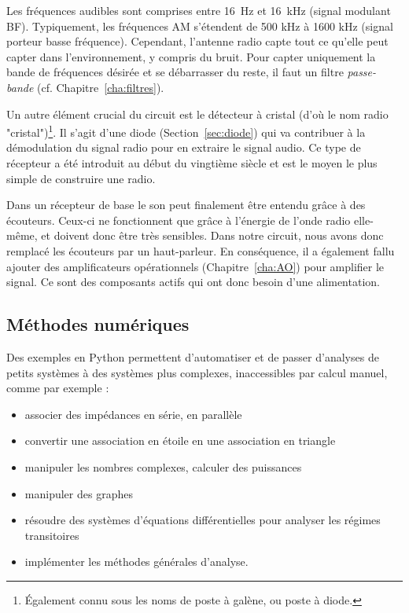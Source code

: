 Les fréquences audibles sont comprises entre 16~Hz et 16~kHz (signal modulant BF). Typiquement, les fréquences AM s'étendent de 500 kHz à 1600 kHz (signal porteur basse fréquence). Cependant, l'antenne radio capte tout ce qu'elle peut capter dans l'environnement, y compris du bruit. Pour capter uniquement la bande de fréquences désirée et se débarrasser du reste, il faut un filtre \textit{passe-bande} (cf. Chapitre~\ref{cha:filtres}).

Un autre élément crucial du circuit est le détecteur à cristal (d'où le nom radio "cristal")\footnote{\'Egalement connu sous les noms de poste à galène, ou poste à diode.}. Il s'agit d'une diode (Section~\ref{sec:diode}) qui va contribuer à la démodulation du signal radio pour en extraire le signal audio. Ce type de récepteur a été introduit au début du vingtième siècle et est le moyen le plus simple de construire une radio.

Dans un récepteur de base le son peut finalement être entendu grâce à des écouteurs. Ceux-ci ne fonctionnent que grâce à l'énergie de l'onde radio elle-même, et doivent donc être très sensibles. Dans notre circuit, nous avons donc remplacé les écouteurs par un haut-parleur. En conséquence, il a également fallu ajouter des amplificateurs opérationnels (Chapitre~\ref{cha:AO}) pour amplifier le signal. Ce sont des composants actifs qui ont donc besoin d'une alimentation.



\subsection{Méthodes numériques}
Des exemples en Python permettent d'automatiser et de passer d'analyses de petits systèmes à des systèmes plus complexes, inaccessibles par calcul manuel, comme par exemple :
\begin{itemize}
	\item associer des impédances en série, en parallèle
	\item convertir une association en étoile en une association en triangle
	\item manipuler les nombres complexes, calculer des puissances 
	\item manipuler des graphes
	\item résoudre des systèmes d'équations différentielles pour analyser les régimes transitoires
	\item implémenter les méthodes générales d'analyse.
\end{itemize}

